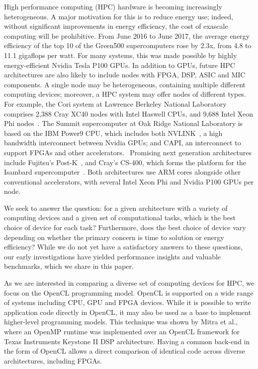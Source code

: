 \documentclass[../document.tex]{subfiles}
\begin{document}
\label{sec:introduction}
	
High performance computing (HPC) hardware is becoming increasingly heterogeneous.
A major motivation for this is to reduce energy use; indeed, without significant improvements in energy efficiency, the cost of exascale computing will be prohibitive.
From June 2016 to June 2017, the average energy efficiency of the top 10 of the Green500 supercomputers rose by 2.3x, from 4.8 to 11.1 gigaflops per watt.\cite{feldman_2017}
For many systems, this was made possible by highly energy-efficient Nvidia Tesla P100 GPUs.
In addition to GPUs, future HPC architectures are also likely to include nodes with FPGA, DSP, ASIC and MIC components.
A single node may be heterogeneous, containing multiple different computing devices; moreover, a HPC system may offer nodes of different types.
For example, the Cori system at Lawrence Berkeley National Laboratory comprises 2,388 Cray XC40 nodes with Intel Haswell CPUs, and 9,688 Intel Xeon Phi nodes~\cite{declerck2016cori}.
The Summit supercomputer at Oak Ridge National Laboratory is based on the IBM Power9 CPU, which includes both NVLINK~\cite{morgan_2016}, a high bandwidth interconnect between Nvidia GPUs; and CAPI, an interconnect to support FPGAs and other accelerators.~\cite{morgan_2017}
Promising next generation architectures include Fujitsu's Post-K~\cite{morgan_2016_postk}, and Cray's CS-400, which forms the platform for the Isambard supercomputer~\cite{feldman_2017_isambard}.
Both architectures use ARM cores alongside other conventional accelerators, with several Intel Xeon Phi and Nvidia P100 GPUs per node.

We seek to answer the question: for a given architecture with a variety of computing devices and a given set of computational tasks, which is the best choice of device for each task?
Furthermore, does the best choice of device vary depending on whether the primary concern is time to solution or energy efficiency?
While we do not yet have a satisfactory answers to these questions, our early investigations have yielded performance insights and valuable benchmarks, which we share in this paper.

As we are interested in comparing a diverse set of computing devices for HPC, we focus on the OpenCL programming model.
OpenCL is supported on a wide range of systems including CPU, GPU and FPGA devices.
While it is possible to write application code directly in OpenCL, it may also be used as a base to implement higher-level programming models.
This technique was shown by Mitra et al.,~\cite{mitra2014implementation} where an OpenMP runtime was implemented over an OpenCL framework for Texas Instruments Keystone II DSP architecture.
Having a common back-end in the form of OpenCL allows a direct comparison of identical code across diverse architectures, including FPGAs.
\end{document}
